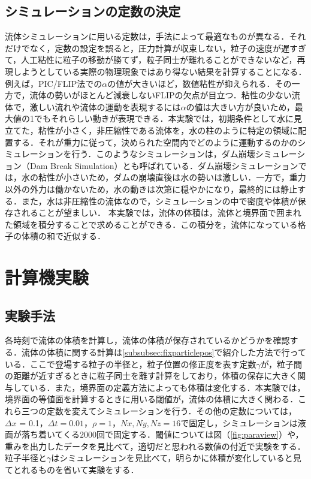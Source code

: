 \documentclass[a4j,12pt]{jreport}
\begin{document}
\section{シミュレーションの定数の決定} \label{sec:constant}
流体シミュレーションに用いる定数は，手法によって最適なものが異なる．それだけでなく，定数の設定を誤ると，圧力計算が収束しない，粒子の速度が遅すぎて，人工粘性に粒子の移動が勝てず，粒子同士が離れることができないなど，再現しようとしている実際の物理現象ではあり得ない結果を計算することになる．例えば，PIC/FLIP法での$\alpha$の値が大きいほど，数値粘性が抑えられる．その一方で，流体の勢いがほとんど減衰しないFLIPの欠点が目立つ．粘性の少ない流体で，激しい流れや流体の運動を表現するには$\alpha$の値は大きい方が良いため，最大値の1でもそれらしい動きが表現できる．本実験では，初期条件として水に見立てた，粘性が小さく，非圧縮性である流体を，水の柱のように特定の領域に配置する．それが重力に従って，決められた空間内でどのように運動するのかのシミュレーションを行う．このようなシミュレーションは，ダム崩壊シミュレーション（Dam Break Simulation）とも呼ばれている．ダム崩壊シミュレーションでは，水の粘性が小さいため，ダムの崩壊直後は水の勢いは激しい．一方で，重力以外の外力は働かないため，水の動きは次第に穏やかになり，最終的には静止する．また，水は非圧縮性の流体なので，シミュレーションの中で密度や体積が保存されることが望ましい．
本実験では，流体の体積は，流体と境界面で囲まれた領域を積分することで求めることができる．この積分を，流体になっている格子の体積の和で近似する．

\chapter{計算機実験} \label{chapter:5}
\section{実験手法} \label{sec:exp_method}
各時刻で流体の体積を計算し，流体の体積が保存されているかどうかを確認する．流体の体積に関する計算は\ref{subsubsec:fixparticlepos}で紹介した方法で行っている．ここで登場する粒子の半径と，粒子位置の修正度を表す定数$\gamma$が，粒子間の距離が近すぎるときに粒子同士を離す計算をしており，体積の保存に大きく関与している．また，境界面の定義方法によっても体積は変化する．本実験では，境界面の等値面を計算するときに用いる閾値が，流体の体積に大きく関わる．これら三つの定数を変えてシミュレーションを行う．その他の定数については，$\varDelta x$ = 0.1，$\varDelta t = 0.01$，$\rho = 1$，$Nx,Ny,Nz = 16$で固定し，シミュレーションは液面が落ち着いてくる$2000回$で固定する．閾値については図（\ref{fig:paraview}）や，重みを出力したデータを見比べて，適切だと思われる数値の付近で実験をする．粒子半径と$\gamma$はシミュレーションを見比べて，明らかに体積が変化していると見てとれるものを省いて実験をする．
\end{document}
